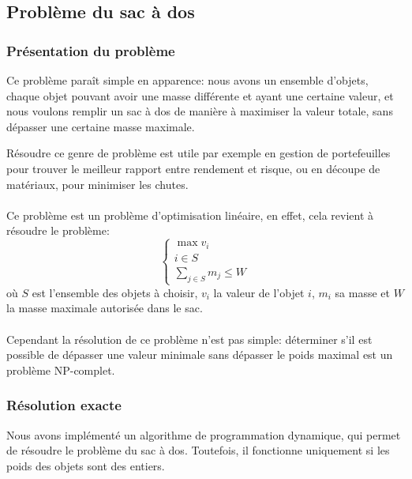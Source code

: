 \subsection{Problème du sac à dos}
  \subsubsection{Présentation du problème}
    Ce problème paraît simple en apparence: nous avons un ensemble d'objets,
    chaque objet pouvant avoir une masse différente et ayant une certaine
    valeur, et nous voulons remplir un sac à dos de manière à maximiser la
    valeur totale, sans dépasser une certaine masse maximale.

    Résoudre ce genre de problème est utile par exemple en gestion de
    portefeuilles pour trouver le meilleur rapport entre rendement et risque,
    ou en découpe de matériaux, pour minimiser les chutes.

    \paragraph{}
    Ce problème est un problème d'optimisation linéaire, en effet, cela revient
    à résoudre le problème:
    \[ \left\{ \begin{array}{l}
        \max v_i \\
        i \in S \\
        \displaystyle\sum_{j \in S} m_j \leq W
      \end{array} \right.
    \]
    où $S$ est l'ensemble des objets à choisir, $v_i$ la valeur de l'objet $i$,
    $m_i$ sa masse et $W$ la masse maximale autorisée dans le sac.

    \paragraph{}
    Cependant la résolution de ce problème n'est pas simple: déterminer s'il
    est possible de dépasser une valeur minimale sans dépasser le poids maximal
    est un problème NP\nobreakdash-complet.

  \subsubsection{Résolution exacte}
    Nous avons implémenté un algorithme de programmation dynamique, qui permet
    de résoudre le problème du sac à dos. Toutefois, il fonctionne uniquement
    si les poids des objets sont des entiers.

